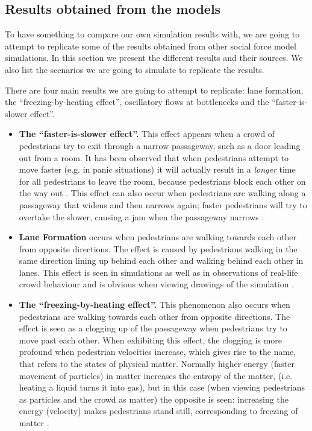 \subsection{Results obtained from the models}
To have something to compare our own simulation results with, we are going to 
attempt to replicate some of the results obtained from other social force 
model simulations. In this section we present the different results and their 
sources. We also list the scenarios we are going to simulate to replicate the 
results.

There are four main results we are going to attempt to replicate: lane 
formation, the ``freezing-by-heating effect'', oscillatory flows at 
bottlenecks and the ``faster-is-slower effect''.

\begin{itemize}
    \item \textbf{The ``faster-is-slower effect''.}  This effect appears when 
        a crowd of pedestrians try to exit through a narrow passageway, such 
        as a door leading out from a room. It has been observed that when 
        pedestrians attempt to move faster (e.g. in panic situations) it will 
        actually result in a \emph{longer} time for all pedestrians to leave 
        the room, because pedestrians block each other on the way out 
        \cite{helbing00}. This effect can also occur when pedestrians are 
        walking along a passageway that widens and then narrows again; faster 
        pedestrians will try to overtake the slower, causing a jam when the 
        passageway narrows \cite{self-org}.

    \item \textbf{Lane Formation} occurs when pedestrians are walking towards 
        each other from opposite directions. The effect is caused by 
        pedestrians walking in the same direction lining up behind each other 
        and walking behind each other in lanes. This effect is seen in 
        simulations as well as in observations of real-life crowd behaviour 
        and is obvious when viewing drawings of the simulation 
        \cite{self-org}.
        
    \item \textbf{The ``freezing-by-heating effect''.} This phenomenon also 
        occurs when pedestrians are walking towards each other from opposite 
        directions. The effect is seen as a clogging up of the passageway when 
        pedestrians try to move past each other. When exhibiting this effect, 
        the clogging is more profound when pedestrian velocities increase, 
        which gives rise to the name, that refers to the states of physical 
        matter. Normally higher energy (faster movement of particles) in 
        matter increases the entropy of the matter, (i.e.  heating a liquid 
        turns it into gas), but in this case (when viewing pedestrians as 
        particles and the crowd as matter) the opposite is seen: increasing 
        the energy (velocity) makes pedestrians stand still, corresponding to 
        freezing of matter \cite{frebyheat}.
        

\end{itemize}
